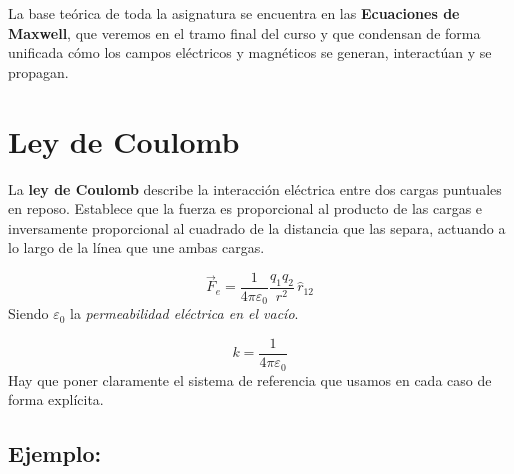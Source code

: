 \documentclass[a4paper,12pt]{article}
\begin{document}
La base teórica de toda la asignatura se encuentra en las \textbf{Ecuaciones de Maxwell}, que veremos en el tramo final del curso y que condensan de forma unificada cómo los campos eléctricos y magnéticos se generan, interactúan y se propagan.

\newpage

\section{Ley de Coulomb}

\noindent
La \textbf{ley de Coulomb} describe la interacción eléctrica entre dos cargas puntuales en reposo. 
Establece que la fuerza es proporcional al producto de las cargas e inversamente proporcional al cuadrado de la distancia que las separa, 
actuando a lo largo de la línea que une ambas cargas.

\[
\vec{F}_e = \frac{1}{4\pi\varepsilon_0} \frac{q_1 q_2}{r^2} \, \hat{r}_{12}
\]
Siendo $\varepsilon_0$ la \textit{permeabilidad eléctrica en el vacío}.

\[
k = \frac{1}{4\pi\varepsilon_0}
\]
Hay que poner claramente el sistema de referencia que usamos en cada caso de forma explícita.  

\subsection*{Ejemplo:}
\end{document}
